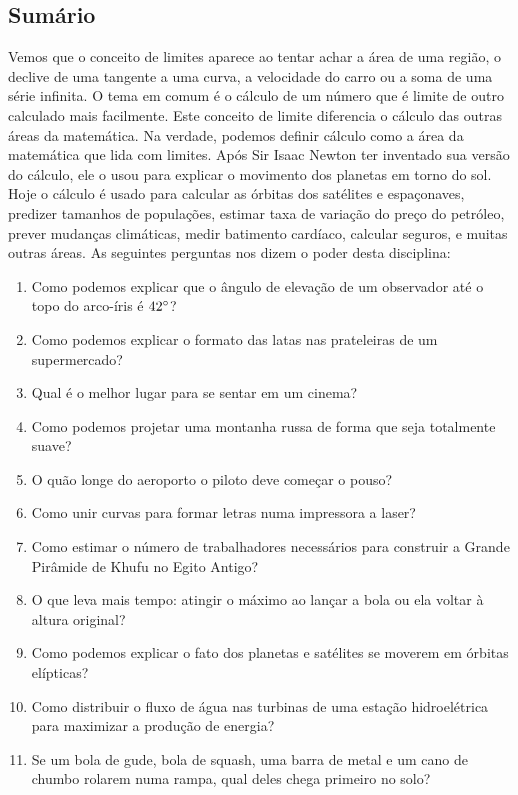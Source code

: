 \subsection{Sumário}
Vemos que o conceito de limites aparece ao tentar achar a área de uma região, o declive de uma tangente a uma curva, a velocidade do carro ou a soma de uma série infinita. O tema em comum é o cálculo de um número que é limite de outro calculado mais facilmente. Este conceito de limite diferencia o cálculo das outras áreas da matemática. Na verdade, podemos definir cálculo como a área da matemática que lida com limites. Após Sir Isaac Newton ter inventado sua versão do cálculo, ele o usou para explicar o movimento dos planetas em torno do sol. Hoje o cálculo é usado para calcular as órbitas dos satélites e espaçonaves, predizer tamanhos de populações, estimar taxa de variação do preço do petróleo, prever mudanças climáticas, medir batimento cardíaco, calcular seguros, e muitas outras áreas. As seguintes perguntas nos dizem o poder desta disciplina:
\begin{enumerate}
  \item Como podemos explicar que o ângulo de elevação de um observador até o topo do arco-íris é $42\degree$?
  \item Como podemos explicar o formato das latas nas prateleiras de um supermercado?
  \item Qual é o melhor lugar para se sentar em um cinema?
  \item Como podemos projetar uma montanha russa de forma que seja totalmente suave?
  \item O quão longe do aeroporto o piloto deve começar o pouso?
  \item Como unir curvas para formar letras numa impressora a laser?
  \item Como estimar o número de trabalhadores necessários para construir a Grande Pirâmide de Khufu no Egito Antigo?
  \item O que leva mais tempo: atingir o máximo ao lançar a bola ou ela voltar à altura original?
  \item Como podemos explicar o fato dos planetas e satélites se moverem em órbitas elípticas?
  \item Como distribuir o fluxo de água nas turbinas de uma estação hidroelétrica para maximizar a produção de energia?
  \item Se um bola de gude, bola de squash, uma barra de metal e um cano de chumbo rolarem numa rampa, qual deles chega primeiro no solo?
\end{enumerate}

